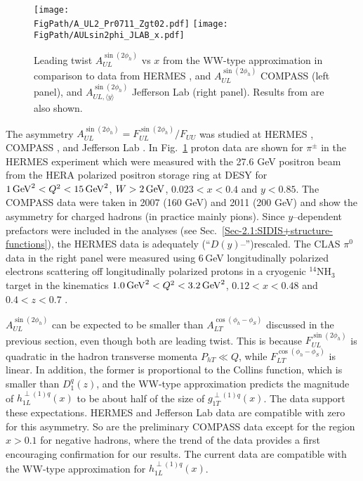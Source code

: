 \documentclass[a4paper,11pt]{article}
\newcommand*{\FigPath}{./figs}%
\begin{document}
\begin{figure}[b!]
\centering
\texttt{[image: \\FigPath/A\_UL2\_Pr0711\_Zgt02.pdf]} \quad
\texttt{[image: \\FigPath/AULsin2phi\_JLAB\_x.pdf]} 
\vspace{-5mm}
 
	\caption{\label{aul_jlab} 
	Leading twist $A_{UL}^{\sin(2\phi_h)}$ vs $x$ from the WW-type 
	approximation in comparison to data from
	HERMES \cite{Airapetian:1999tv}, and $A_{UL}^{\sin(2\phi_h)}$
	COMPASS \cite{Parsamyan:2015dfa} (left panel), and $A_{UL,  \langle y\rangle}^{\sin(2\phi_h)}$ 
	Jefferson Lab \cite{Jawalkar:2017ube} (right panel). Results  
	from \cite{Avakian:2007mv} are also shown.}
\end{figure}

The asymmetry $A_{UL}^{\sin(2\phi_h)}=F_{UL}^{\sin(2\phi_h)}/F_{UU}$  was 
studied at HERMES \cite{Airapetian:1999tv,Airapetian:2002mf}, COMPASS 
\cite{Parsamyan:2018ovx}, and Jefferson Lab \cite{Avakian:2010ae,Jawalkar:2017ube}.
In Fig.~\ref{aul_jlab} proton data are shown for $\pi^\pm$ in the
HERMES experiment which were measured with the 27.6 GeV positron
beam from the HERA polarized positron storage ring at DESY for 
$1\,{\rm GeV}^2 < Q^2 < 15 \,{\rm GeV}^2$, $W > 2\,{\rm GeV}$,
$0.023 < x < 0.4$ and $y < 0.85$. 
The COMPASS data were taken in 2007 (160 GeV) and 2011 (200 GeV) and show 
the asymmetry for charged hadrons (in practice mainly pions).
Since $y$--dependent prefactors were included in the analyses 
(see Sec.~\ref{Sec-2.1:SIDIS+structure-functions}),
the HERMES data is adequately (``$D(y)$--'')rescaled.
The CLAS $\pi^0$ data in the right panel were measured using 6$\,$GeV 
longitudinally polarized electrons scattering off 
longitudinally polarized protons in a cryogenic $^{14}$NH$_3$ 
target in the kinematics $1.0\,{\rm GeV}^2 < Q^2 < 3.2\,{\rm GeV}^2$, 
$0.12 < x < 0.48$ and $0.4 < z < 0.7$ \cite{Jawalkar:2017ube}.

$A_{UL}^{\sin(2\phi_h)}$  can be expected to be smaller than 
$A_{LT}^{\cos(\phi_h -\phi_S)}$ discussed in the previous section,
even though both are leading twist. This is because 
$F_{UL}^{\sin(2\phi_h)}$ is quadratic in the hadron transverse 
momenta $P_{hT}\ll Q$, while $F_{LT}^{\cos(\phi_h -\phi_S)}$ is linear. 
In addition, the former is proportional to the Collins function, 
which is smaller than $D_1^q(z)$, and the WW-type approximation 
predicts the magnitude of $h_{1L}^{\perp(1)q}(x)$ to be about half 
of the size of $g_{1T}^{\perp(1)q}(x)$.
The data support these expectations. HERMES and Jefferson Lab data are compatible
with zero for this asymmetry. So are the preliminary COMPASS data except for the region
$x>0.1$ for negative hadrons, where the trend of the data provides a first 
encouraging confirmation for our results. The current data are compatible
with the WW-type approximation for $h_{1L}^{\perp(1)q}(x)$. 
\end{document}

